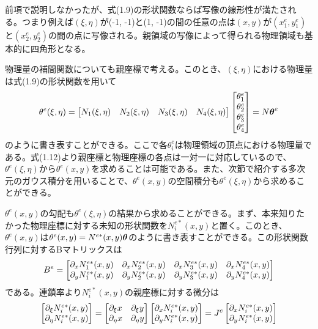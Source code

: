 \documentclass[dvipdfmx, 9pt, a4paper]{jsarticle}
\numberwithin{equation}{section}
\newcommand{\bm}[1]{{\mbox{\boldmath $#1$}}}
\begin{document}
前項で説明しなかったが、式(1.9)の形状関数ならば写像の線形性が満たされる。つまり例えば$(\xi, \eta)$が(-1, -1)と(1, -1)の間の任意の点は$(x, y)$が$(x^e_1, y^e_1)$と$(x^e_2, y^e_2)$の間の点に写像される。親領域の写像によって得られる物理領域も基本的に四角形となる。\par
物理量の補間関数についても親座標で考える。このとき、$(\xi, \eta)$における物理量は式(1.9)の形状関数を用いて
\begin{equation}
\theta^e(\xi, \eta)=
\begin{bmatrix}
N_1(\xi, \eta) & N_2(\xi, \eta) & N_3(\xi, \eta) & N_4(\xi, \eta)
\end{bmatrix}
\begin{bmatrix}
\theta^e_1 \\ \theta^e_2 \\ \theta^e_3 \\ \theta^e_4
\end{bmatrix}=N\bm \theta^e
\end{equation}
のように書き表すことができる。ここで各$\theta^e_i$は物理領域の頂点における物理量である。式(1.12)より親座標と物理座標の各点は一対一に対応しているので、$\theta^e(\xi, \eta)$から$\theta^e(x, y)$を求めることは可能である。また、次節で紹介する多次元のガウス積分を用いることで、$\theta^e(x, y)$の空間積分も$\theta^e(\xi, \eta)$から求めることができる。\par
$\theta^e(x, y)$の勾配も$\theta^e(\xi, \eta)$の結果から求めることができる。まず、本来知りたかった物理座標に対する未知の形状関数を$N^{e*}_i(x, y)$と置く。このとき、$\theta^e(x, y)$は$\theta^e(x, y)=N^{e*}(x, y)\bm \theta$のように書き表すことができる。この形状関数行列に対するBマトリックスは
\begin{equation}
B^e=
\begin{bmatrix}
\partial_xN^{e*}_1(x, y) & \partial_xN^{e*}_2(x, y)& \partial_xN^{e*}_3(x, y) & \partial_xN^{e*}_4(x, y) \\
\partial_yN^{e*}_1(x, y) & \partial_yN^{e*}_2(x, y) & \partial_yN^{e*}_3(x, y) & \partial_yN^{e*}_4(x, y) \\
\end{bmatrix} \notag
\end{equation}
である。連鎖率より$N^{e*}_i(x, y)$の親座標に対する微分は
\begin{equation}
\begin{bmatrix}
\partial_\xi N^{e*}_i(x, y) \\ \partial_\eta N^{e*}_i(x, y)
\end{bmatrix}=
\begin{bmatrix}
\partial_\xi x & \partial_\xi y \\
\partial_\eta x & \partial_\eta y \\
\end{bmatrix}
\begin{bmatrix}
\partial_x N^{e*}_i(x, y) \\ \partial_y N^{e*}_i(x, y)
\end{bmatrix}
=J^e
\begin{bmatrix}
\partial_x N^{e*}_i(x, y) \\ \partial_y N^{e*}_i(x, y)
\end{bmatrix} \notag
\end{equation}
\end{document}
